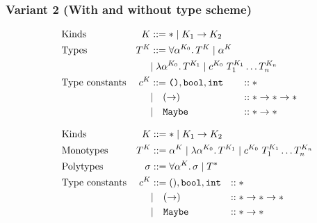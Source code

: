 \documentclass[acmsmall, 9pt]{article}
\begin{document}
\subsubsection{Variant 2 (With and without type scheme)}
\begin{figure}[H]
\vspace{-0.8cm}
\centering
\hspace{-2cm}
\begin{subfigure}{0.3\textwidth}
  \begin{align*}
    &\text{Kinds} &K &::= * \; | \; K_1 \rightarrow K_2 \span\span\\
    &\text{Types}  &T^K &::= \forall \alpha^{K_0} . \, T^{K}\; | \; \alpha^K \; \\
    &&&| \;  \lambda \alpha^{K_0}. \, T^{K_1} \; | \; c^{K_0} \; T_1^{K_1} \ldots T_n^{K_n}  \span\span\\
    &\text{Type constants}  &c^K &::= \texttt{()}, \texttt{bool}, \texttt{int} &::& \; *\\
    &&&| \quad (\rightarrow) &::& \; * \rightarrow * \rightarrow * \\
    &&&| \quad \texttt{Maybe} &::& \; * \rightarrow * \hspace{1cm}
  \end{align*}
\end{subfigure}%
\begin{subfigure}{0.6\textwidth}
  \begin{align*}
    &\text{Kinds} &K &::= * \; | \; K_1 \rightarrow K_2 \span\span\\
    &\text{Monotypes} &T^K &::= \alpha^K \; | \; \lambda \alpha^{K_0}. \, T^{K_1} \; | \; c^{K_0} \; T_1^{K_1} \ldots T_n^{K_n}  \span\span\\
    &\text{Polytypes} &\sigma &::= \forall \alpha^K . \, \sigma \; | \; T^*\\
    &\text{Type constants} &c^K &::= (), \texttt{bool}, \texttt{int} &::& \; *\\
    &&&| \quad (\rightarrow) &::& \; * \rightarrow * \rightarrow * \\
    &&&| \quad \texttt{Maybe} &::& \; * \rightarrow *
  \end{align*}
\end{subfigure}
\hspace{1cm}
\end{figure}
\end{document}
